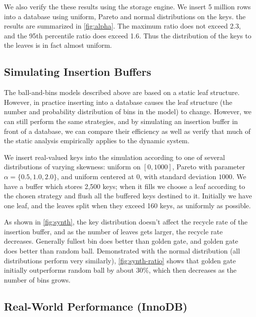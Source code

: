 

We also verify the these results using the \innodb{} storage engine. We insert
5 million rows into a database using uniform, Pareto and normal distributions
on the keys. the results are summarized in \cref{fig:alpha}. The maximum ratio
does not exceed 2.3, and the 95th percentile ratio does exceed 1.6. Thus the
distribution of the keys to the leaves is in fact almost uniform.

\subsection{Simulating Insertion Buffers}\label{sec:br-exp-synthetic}

The ball-and-bins models described above are based on a static leaf structure.
However, in practice inserting into a database causes the leaf structure (the
number and probability distribution of bins in the model) to change. However,
we can still perform the same strategies, and by simulating an insertion buffer
in front of a database, we can compare their efficiency as well as verify that
much of the static analysis empirically applies to the dynamic system.

We insert real-valued keys into the simulation according to one of several
distributions of varying skewness: uniform on $[0,1000]$, Pareto with parameter
$\alpha=\{0.5,1.0,2.0\}$, and uniform centered at 0, with standard deviation
$1000$. We have a buffer which stores 2,500 keys; when it fills we choose a
leaf according to the chosen strategy and flush all the buffered keys destined
to it. Initially we have one leaf, and the leaves split when they exceed 160
keys, as uniformly as possible. 

As shown in \cref{fig:synth}, the key distribution doesn't affect the recycle
rate of the insertion buffer, and as the number of leaves gets larger, the
recycle rate decreases. Generally fullest bin does better than golden gate, and
golden gate does better than random ball. Demonstrated with the normal
distribution (all distributions perform very similarly), \cref{fig:synth-ratio}
shows that golden gate initially outperforms random ball by about 30\%, which
then decreases as the number of bins grows.


\subsection{Real-World Performance (InnoDB)}\label{sec:br-exp-innodb}

